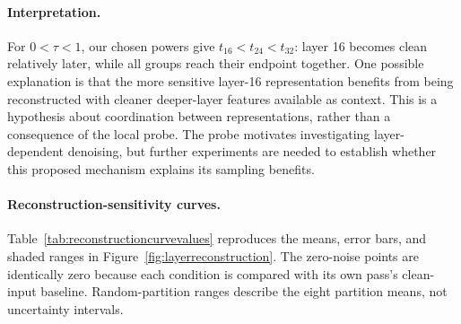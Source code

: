 \documentclass{article}
\begin{document}
\paragraph{Interpretation.}
For $0<\tau<1$, our chosen powers give $t_{16}<t_{24}<t_{32}$: layer 16 becomes clean relatively later, while all groups reach their endpoint together. One possible explanation is that the more sensitive layer-16 representation benefits from being reconstructed with cleaner deeper-layer features available as context. This is a hypothesis about coordination between representations, rather than a consequence of the local probe. The probe motivates investigating layer-dependent denoising, but further experiments are needed to establish whether this proposed mechanism explains its sampling benefits.

\paragraph{Reconstruction-sensitivity curves.}
Table~\ref{tab:reconstructioncurvevalues} reproduces the means, error bars, and shaded ranges in Figure~\ref{fig:layerreconstruction}. The zero-noise points are identically zero because each condition is compared with its own pass's clean-input baseline. Random-partition ranges describe the eight partition means, not uncertainty intervals.
\end{document}
